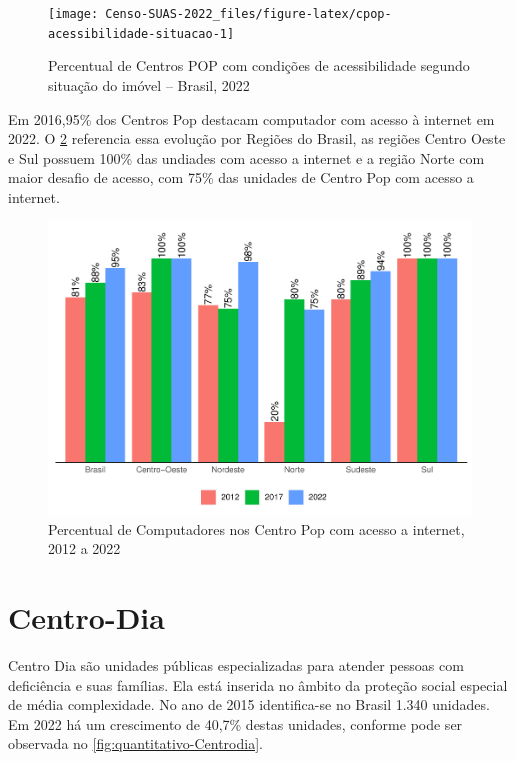 \documentclass[
  brazilian]{report}
\begin{document}
\begin{figure}
\texttt{[image: Censo-SUAS-2022\_files/figure-latex/cpop-acessibilidade-situacao-1]} \caption[Percentual de Centros POP com condições de acessibilidade segundo situação do imóvel – Brasil, 2022]{Percentual de Centros POP com condições de acessibilidade segundo situação do imóvel – Brasil, 2022}\label{fig:cpop-acessibilidade-situacao}
\end{figure}

Em 2016,95\% dos Centros Pop destacam computador com acesso à internet
em 2022. O \cref{fig:cpop-internet-percentual} referencia essa evolução
por Regiões do Brasil, as regiões Centro Oeste e Sul possuem 100\% das
undiades com acesso a internet e a região Norte com maior desafio de
acesso, com 75\% das unidades de Centro Pop com acesso a internet.

\begin{figure}
\includegraphics{Censo-SUAS-2022_files/figure-latex/cpop-internet-percentual-1} \caption[Percentual de Computadores nos Centro Pop com acesso a internet, 2012 a 2022]{Percentual de Computadores nos Centro Pop com acesso a internet, 2012 a 2022}\label{fig:cpop-internet-percentual}
\end{figure}

\hypertarget{centro-dia}{%
\section{Centro-Dia}\label{centro-dia}}

Centro Dia são unidades públicas especializadas para atender pessoas com
deficiência e suas famílias. Ela está inserida no âmbito da proteção
social especial de média complexidade. No ano de 2015 identifica-se no
Brasil 1.340 unidades. Em 2022 há um crescimento de 40,7\% destas
unidades, conforme pode ser observada no
\cref{fig:quantitativo-Centrodia}.
\end{document}
